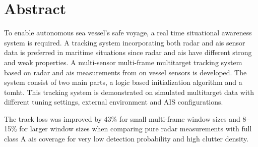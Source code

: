 
\section*{\huge Abstract}
\hfill
\noindent

To enable autonomous sea vessel's safe voyage, a real time situational awareness system is required. A tracking system incorporating both radar and \gls{ais} sensor data is preferred in maritime situations since radar and \gls{ais} have different strong and weak properties. A multi-sensor multi-frame multitarget tracking system based on radar and \gls{ais} \glspl{measurement} from on vessel sensors is developed. The system consist of two main parts, a logic based initialization algorithm and a \gls{tomht}. This tracking system is demonstrated on simulated multitarget data with different tuning settings, external environment and AIS configurations.

The track loss was improved by 43\% for small multi-frame window sizes and 8--15\% for larger window sizes when comparing pure radar measurements with full class A \gls{ais} coverage for very low detection probability and high clutter density.
